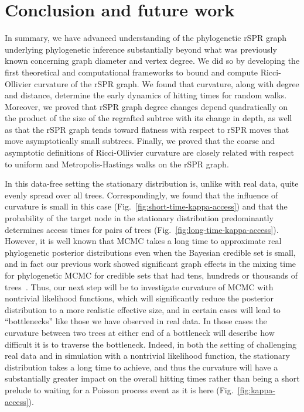 \documentclass[11pt,onecolumn,conference]{IEEEtran}
\begin{document}
\section{Conclusion and future work}
In summary, we have advanced understanding of the phylogenetic rSPR graph underlying phylogenetic inference substantially beyond what was previously known concerning graph diameter and vertex degree.
We did so by developing the first theoretical and computational frameworks to bound and compute Ricci-Ollivier curvature of the rSPR graph.
We found that curvature, along with degree and distance, determine the early dynamics of hitting times for random walks.
Moreover, we proved that rSPR graph degree changes depend quadratically on the product of the size of the regrafted subtree with its change in depth, as well as that the rSPR graph tends toward flatness with respect to rSPR moves that move asymptotically small subtrees.
Finally, we proved that the coarse and asymptotic definitions of Ricci-Ollivier curvature are closely related with respect to uniform and Metropolis-Hastings walks on the rSPR graph.

In this data-free setting the stationary distribution is, unlike with real data, quite evenly spread over all trees.
Correspondingly, we found that the influence of curvature is small in this case (Fig.~\ref{fig:short-time-kappa-access}) and that the probability of the target node in the stationary distribution predominantly determines access times for pairs of trees (Fig.~\ref{fig:long-time-kappa-access}).
However, it is well known that MCMC takes a long time to approximate real phylogenetic posterior distributions even when the Bayesian credible set is small, and in fact our previous work showed significant graph effects in the mixing time for phylogenetic MCMC for credible sets that had tens, hundreds or thousands of trees~\cite{Whidden2015-yi}.
Thus, our next step will be to investigate curvature of MCMC with nontrivial likelihood functions, which will significantly reduce the posterior distribution to a more realistic effective size, and in certain cases will lead to ``bottlenecks'' like those we have observed in real data.
In those cases the curvature between two trees at either end of a bottleneck will describe how difficult it is to traverse the bottleneck.
Indeed, in both the setting of challenging real data and in simulation with a nontrivial likelihood function, the stationary distribution takes a long time to achieve, and thus the curvature will have a substantially greater impact on the overall hitting times rather than being a short prelude to waiting for a Poisson process event as it is here (Fig.~\ref{fig:kappa-access}).
\end{document}
